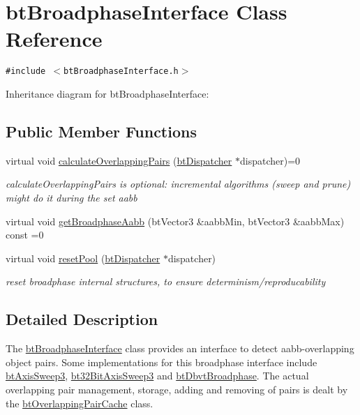 \hypertarget{classbt_broadphase_interface}{
\section{btBroadphaseInterface Class Reference}
\label{classbt_broadphase_interface}
}
{\tt \#include $<$btBroadphaseInterface.h$>$}

Inheritance diagram for btBroadphaseInterface:\subsection*{Public Member Functions}
\begin{CompactItemize}
\item 
\hypertarget{classbt_broadphase_interface_27e29cb6fd31e5fe626e7ba973e67ddb}{
virtual void \hyperlink{classbt_broadphase_interface_27e29cb6fd31e5fe626e7ba973e67ddb}{calculateOverlappingPairs} (\hyperlink{classbt_dispatcher}{btDispatcher} $\ast$dispatcher)=0}
\label{classbt_broadphase_interface_27e29cb6fd31e5fe626e7ba973e67ddb}

\begin{CompactList}\small\item\em calculateOverlappingPairs is optional: incremental algorithms (sweep and prune) might do it during the set aabb \item\end{CompactList}\item 
virtual void \hyperlink{classbt_broadphase_interface_b5af9e26414f5a72a76040b8fab4d9e2}{getBroadphaseAabb} (btVector3 \&aabbMin, btVector3 \&aabbMax) const =0
\item 
\hypertarget{classbt_broadphase_interface_8135b10b29bced0b1c62ba6be060dc29}{
virtual void \hyperlink{classbt_broadphase_interface_8135b10b29bced0b1c62ba6be060dc29}{resetPool} (\hyperlink{classbt_dispatcher}{btDispatcher} $\ast$dispatcher)}
\label{classbt_broadphase_interface_8135b10b29bced0b1c62ba6be060dc29}

\begin{CompactList}\small\item\em reset broadphase internal structures, to ensure determinism/reproducability \item\end{CompactList}\end{CompactItemize}


\subsection{Detailed Description}
The \hyperlink{classbt_broadphase_interface}{btBroadphaseInterface} class provides an interface to detect aabb-overlapping object pairs. Some implementations for this broadphase interface include \hyperlink{classbt_axis_sweep3}{btAxisSweep3}, \hyperlink{classbt32_bit_axis_sweep3}{bt32BitAxisSweep3} and \hyperlink{structbt_dbvt_broadphase}{btDbvtBroadphase}. The actual overlapping pair management, storage, adding and removing of pairs is dealt by the \hyperlink{classbt_overlapping_pair_cache}{btOverlappingPairCache} class. 

